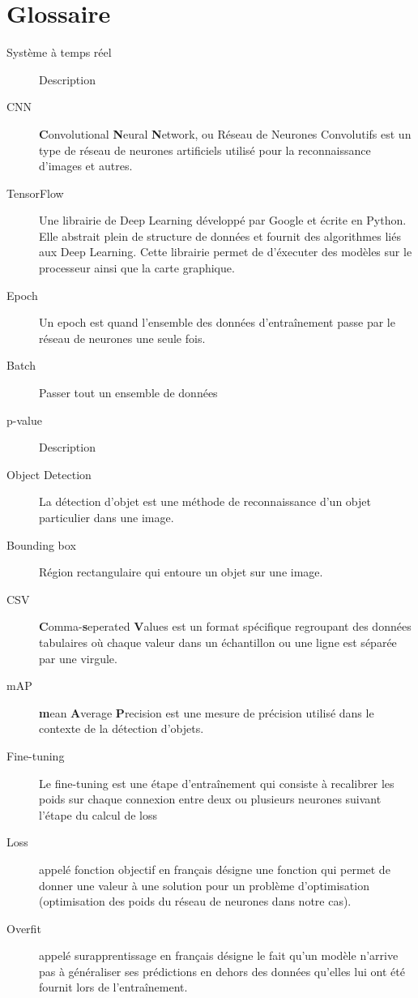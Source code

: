 \documentclass[french]{article}
\theoremstyle{mytheoremstyle}
\theoremstyle{mytheoremstyle}
\theoremstyle{myproblemstyle}
\begin{document}
\section*{Glossaire}

\begin{description}  
\item [Système à temps réel] Description
\item [CNN] \textbf{C}onvolutional \textbf{N}eural \textbf{N}etwork, ou Réseau de Neurones Convolutifs est un type de réseau de neurones artificiels utilisé pour la reconnaissance d'images et autres.
\item [TensorFlow] Une librairie de Deep Learning développé par Google et écrite en Python. Elle abstrait plein de structure de données et fournit des algorithmes liés aux Deep Learning. Cette librairie permet de d'éxecuter des modèles sur le processeur ainsi que la carte graphique.
\item [Epoch] Un epoch est quand l'ensemble des données d'entraînement passe par le réseau de neurones une seule fois.
\item [Batch] Passer tout un ensemble de données 
\item [p-value] Description
\item [Object Detection] La détection d'objet est une méthode de reconnaissance d'un objet particulier dans une image.
\item [Bounding box] Région rectangulaire qui entoure un objet sur une image.
\item [CSV] \textbf{C}omma-\textbf{s}eperated \textbf{V}alues est un format spécifique regroupant des données tabulaires où chaque valeur dans un échantillon ou une ligne est séparée par une virgule.
\item [mAP] \textbf{m}ean \textbf{A}verage \textbf{P}recision est une mesure de précision utilisé dans le contexte de la détection d'objets.
\item [Fine-tuning] Le fine-tuning est une étape d'entraînement qui consiste à recalibrer les poids sur chaque connexion entre deux ou plusieurs neurones suivant l'étape du calcul de loss
\item [Loss] appelé fonction objectif en français désigne une fonction qui permet de donner une valeur à une solution pour un problème d'optimisation (optimisation des poids du réseau de neurones dans notre cas).
\item [Overfit] appelé surapprentissage en français désigne le fait qu'un modèle n'arrive pas à généraliser ses prédictions en dehors des données qu'elles lui ont été fournit lors de l'entraînement.
\end{description}
\end{document}
